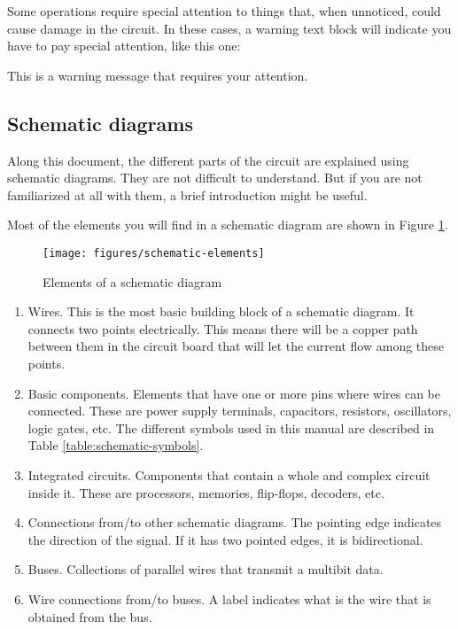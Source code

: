 Some operations require special attention to things that, when unnoticed, could cause damage in the circuit. In these cases, a warning text block will indicate you have to pay special attention, like this one:

\begin{warning}
	This is a warning message that requires your attention.
\end{warning}

\subsection{Schematic diagrams}

Along this document, the different parts of the circuit are explained using schematic diagrams. They are not difficult to understand. But if you are not familiarized at all with them, a brief introduction might be useful. 

Most of the elements you will find in a schematic diagram are shown in Figure \ref{fig:schematic-elements}.

\begin{figure}[h]
	\centering
	\texttt{[image: figures/schematic-elements]}
	\caption{Elements of a schematic diagram}
	\label{fig:schematic-elements}
\end{figure}

\begin{enumerate}
	\item Wires. This is the most basic building block of a schematic diagram. It connects two points electrically. This means there will be a copper path between them in the circuit board that will let the current flow among these points.
	\item Basic components. Elements that have one or more pins where wires can be connected. These are power supply terminals, capacitors, resistors, oscillators, logic gates, etc. The different symbols used in this manual are described in Table \ref{table:schematic-symbols}.
	\item Integrated circuits. Components that contain a whole and complex circuit inside it. These are processors, memories, flip-flops, decoders, etc.
	\item Connections from/to other schematic diagrams. The pointing edge indicates the direction of the signal. If it has two pointed edges, it is bidirectional.
	\item Buses. Collections of parallel wires that transmit a multibit data.
	\item Wire connections from/to buses. A label indicates what is the wire that is obtained from the bus.
\end{enumerate}

